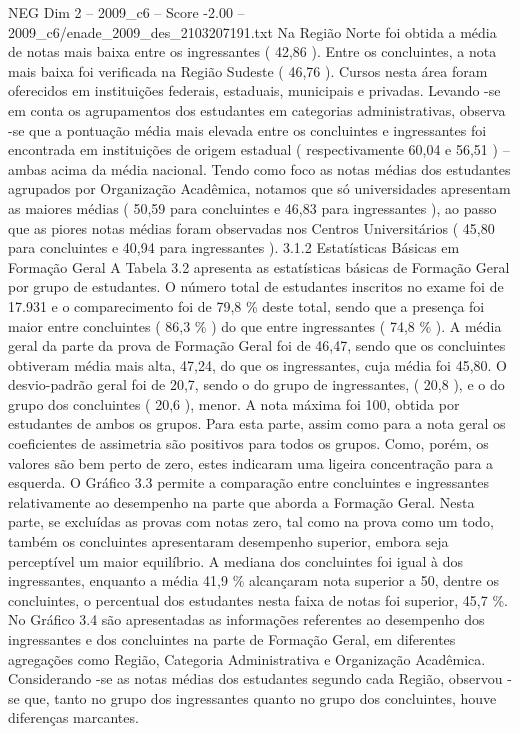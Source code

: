 \begin{textsample}{NEG Dim 2 – 2009\_c6 – Score -2.00 – 2009\_c6/enade\_2009\_des\_2103207191.txt}
Na Região Norte foi obtida a média de notas mais baixa entre os ingressantes ( 42,86 ).
Entre os concluintes, a nota mais baixa foi verificada na Região Sudeste ( 46,76 ).
Cursos nesta área foram oferecidos em instituições federais, estaduais, municipais e privadas.
Levando -se em conta os agrupamentos dos estudantes em categorias administrativas, observa -se que a pontuação média mais elevada entre os concluintes e ingressantes foi encontrada em instituições de origem estadual ( respectivamente 60,04 e 56,51 ) – ambas acima da média nacional.
Tendo como foco as notas médias dos estudantes agrupados por Organização Acadêmica, notamos que só universidades apresentam as maiores médias ( 50,59 para concluintes e 46,83 para ingressantes ), ao passo que as piores notas médias foram observadas nos Centros Universitários ( 45,80 para concluintes e 40,94 para ingressantes ). 3.1.2 Estatísticas Básicas em Formação Geral A Tabela 3.2 apresenta as estatísticas básicas de Formação Geral por grupo de estudantes.
O número total de estudantes inscritos no exame foi de 17.931 e o comparecimento foi de 79,8 \% deste total, sendo que a presença foi maior entre concluintes ( 86,3 \% ) do que entre ingressantes ( 74,8 \% ).
A média geral da parte da prova de Formação Geral foi de 46,47, sendo que os concluintes obtiveram média mais alta, 47,24, do que os ingressantes, cuja média foi 45,80.
O desvio-padrão geral foi de 20,7, sendo o do grupo de ingressantes, ( 20,8 ), e o do grupo dos concluintes ( 20,6 ), menor.
A nota máxima foi 100, obtida por estudantes de ambos os grupos.
Para esta parte, assim como para a nota geral os coeficientes de assimetria são positivos para todos os grupos.
Como, porém, os valores são bem perto de zero, estes indicaram uma ligeira concentração para a esquerda.
O Gráfico 3.3 permite a comparação entre concluintes e ingressantes relativamente ao desempenho na parte que aborda a Formação Geral.
Nesta parte, se excluídas as provas com notas zero, tal como na prova como um todo, também os concluintes apresentaram desempenho superior, embora seja perceptível um maior equilíbrio.
A mediana dos concluintes foi igual à dos ingressantes, enquanto a média 41,9 \% alcançaram nota superior a 50, dentre os concluintes, o percentual dos estudantes nesta faixa de notas foi superior, 45,7 \%.
No Gráfico 3.4 são apresentadas as informações referentes ao desempenho dos ingressantes e dos concluintes na parte de Formação Geral, em diferentes agregações como Região, Categoria Administrativa e Organização Acadêmica.
Considerando -se as notas médias dos estudantes segundo cada Região, observou -se que, tanto no grupo dos ingressantes quanto no grupo dos concluintes, houve diferenças marcantes.

\end{textsample}
